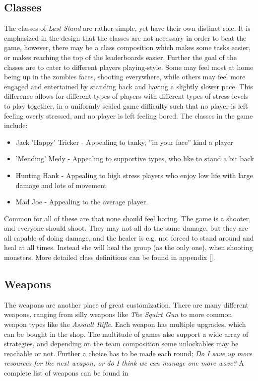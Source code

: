 \subsection*{Classes}\label{gamedesign:ourgame:classes}
The classes of \emph{Last Stand} are rather simple, yet have their own distinct role. It is emphasized in the design that the classes are not necessary in order to beat the game, however, there may be a class composition which makes some tasks easier, or makes reaching the top of the leaderboards easier. 
Further the goal of the classes are to cater to different players playing-style. Some may feel most at home being up in the zombies faces, shooting everywhere, while others may feel more engaged and entertained by standing back and having a slightly slower pace. This difference allows for different types of players with different types of stress-levels to play together, in a uniformly scaled game difficulty such that no player is left feeling overly stressed, and no player is left feeling bored. The classes in the game include:

\begin{itemize}
\item Jack 'Happy' Tricker - Appealing to tanky, ''in your face'' kind a player
\item 'Mending' Medy - Appealing to supportive types, who like to stand a bit back
\item Hunting Hank - Appealing to high stress players who enjoy low life with large damage and lots of movement
\item Mad Joe - Appealing to the average player.
\end{itemize}

Common for all of these are that none should feel boring. The game is a shooter, and everyone should shoot. They may not all do the same damage, but they are all capable of doing damage, and the healer is e.g. not forced to stand around and heal at all times. Instead she will heal the group (as the only one), when shooting monsters. More detailed class definitions can be found in appendix \ref{}. 

\subsection*{Weapons}\label{gamedesign:ourgame:weapons}
The weapons are another place of great customization. There are many different weapons, ranging from silly weapons like \emph{The Squirt Gun} to more common weapon types like the \emph{Assault Rifle}. Each weapon has multiple upgrades, which can be bought in the shop. The multitude of games also support a wide array of strategies, and depending on the team composition some unlockables may be reachable or not. Further a choice has to be made each round; \emph{Do I save up more resources for the next weapon, or do I think we can manage one more wave?} A complete list of weapons can be found in \appendix{} 


